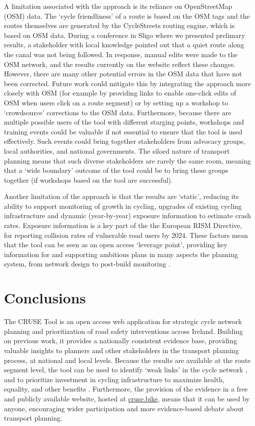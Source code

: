 \documentclass[
  super,
  preprint,
  3p]{elsarticle}
\begin{document}
A limitation associated with the approach is its reliance on
OpenStreetMap (OSM) data. The `cycle friendliness' of a route is based
on the OSM tags and the routes themselves are generated by the
CycleStreets routing engine, which is based on OSM data. During a
conference in Sligo where we presented prelimary results, a stakeholder
with local knowledge pointed out that a quiet route along the canal was
not being followed. In response, manual edits were made to the OSM
network, and the results currently on the website reflect these changes.
However, there are many other potential errors in the OSM data that have
not been corrected. Future work could mitigate this by integrating the
approach more closely with OSM (for example by providing links to enable
one-click edits of OSM when users click on a route segment) or by
setting up a workshop to `crowdsource' corrections to the OSM data.
Furthermore, because there are multiple possible users of the tool with
different starging points, workshops and training events could be
valuable if not essential to ensure that the tool is used effectively.
Such events could bring together stakeholders from advocacy groups,
local authorities, and national governments. The siloed nature of
transport planning means that such diverse stakeholders are rarely the
same room, meaning that a `wide boundary' outcome of the tool could be
to bring these groups together (if workshops based on the tool are
successful).

Another limitation of the approach is that the results are `static',
reducing its ability to support monitoring of growth in cycling,
upgrades of existing cycling infrastructure and dynamic (year-by-year)
exposure information to estimate crash rates. Exposure information is a
key part of the the European RISM Directive, for reporting collision
rates of vulnerable road users by 2024. These factors mean that the tool
can be seen as an open access `leverage point', providing key
information for and supporting ambitious plans in many aspects the
planning system, from network design to post-build monitoring
\citep{lovelace2020}.

\section{Conclusions}\label{sec-conclusions}

The CRUSE Tool is an open access web application for strategic cycle
network planning and prioritization of road safety interventions across
Ireland. Building on previous work, it provides a nationally consistent
evidence base, providing valuable insights to planners and other
stakeholders in the transport planning process, at national and local
levels. Because the results are available at the route segment level,
the tool can be used to identify `weak links' in the cycle network
\citep{vybornova2022}, and to prioritize investment in cycling
infrastructure to maximize health, equality, and other benefits
\citep{mahfouz, woodcock2021}. Furthermore, the provision of the
evidence in a free and publicly available website, hosted at
\href{https://cruse.bike}{cruse.bike}, means that it can be used by
anyone, encouraging wider participation and more evidence-based debate
about transport planning.
\end{document}
